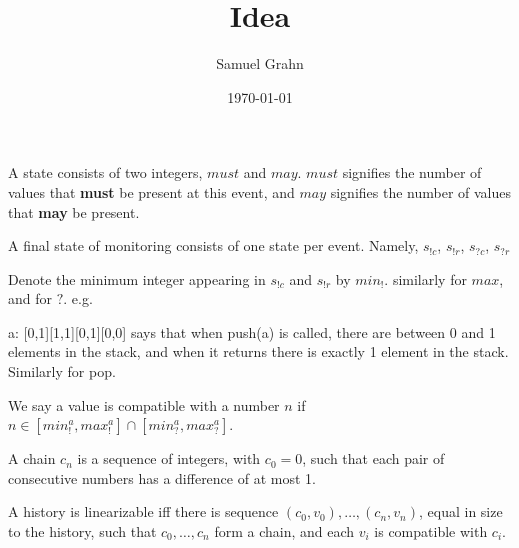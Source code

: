\documentclass[11pt]{article}
\author{Samuel Grahn}
\date{\today}
\title{Idea}
\begin{document}
\maketitle
\tableofcontents

A state consists of two integers, \(must\) and \(may\).
\(must\) signifies the number of values that \textbf{must} be present at this event, and
\(may\) signifies the number of values that \textbf{may} be present.

A final state of monitoring consists of one state per event. Namely, \(s_{!c}\), \(s_{!r}\), \(s_{?c}\), \(s_{{?r}}\)

Denote the minimum integer appearing in \(s_{{!c}}\) and \(s_{!r}\) by \(min_!\). similarly for \(max\), and for \(?\).
e.g.

a: [0,1][1,1][0,1][0,0]
says that when push(a) is called, there are between 0 and 1 elements in the stack, and when it returns there is exactly 1 element in the stack. Similarly for pop.

We say a value is compatible with a number \(n\) if
\(n \in [min_!^a, max_!^a] \cap [ min_?^a, max_?^a]\).

A chain \(c_n\) is a sequence of integers, with \(c_0 = 0\), such that each pair of consecutive numbers has a difference of at most 1.

A history is linearizable iff there is sequence \((c_0, v_0), \dots, (c_n, v_n)\), equal in size to the history, such that
\(c_0, \dots, c_n\) form a chain, and each \(v_i\) is compatible with \(c_i\).
\end{document}
